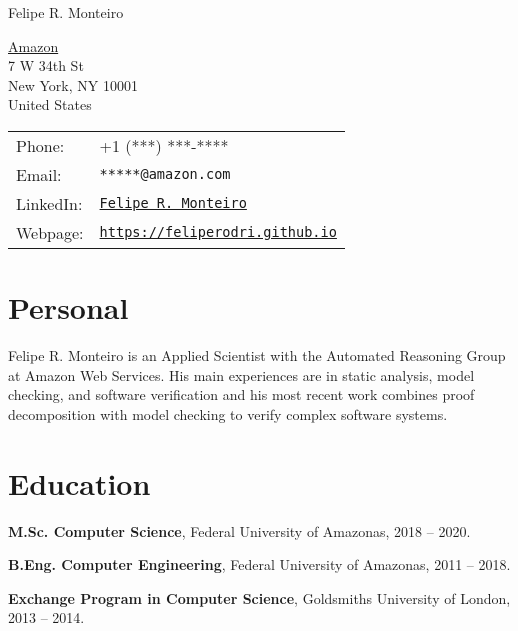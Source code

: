 \documentclass[letterpaper]{article}
\def\name{Felipe R. Monteiro}
\renewenvironment{itemize}{
  \begin{list}{}{
    \setlength{\leftmargin}{1.5em}
  }
}{
  \end{list}
}
\begin{document}
{\huge \name}


\vspace{0.25in}

\begin{minipage}{0.45\linewidth}
  \href{https://aws.amazon.com/security/provable-security/}{Amazon} \\
  7 W 34th St \\
 New York, NY 10001 \\
  United States
\end{minipage}
\hfill
\begin{minipage}{0.45\linewidth}
  \begin{tabular}{ll}
    Phone: & +1 (***) ***-**** \\
    Email: & {\tt ******@amazon.com} \\
    LinkedIn: & \href{https://www.linkedin.com/in/felipe-r-monteiro-91643157/}{\tt Felipe R. Monteiro} \\
    Webpage: & \href{https://feliperodri.github.io}{\tt https://feliperodri.github.io} \\
  \end{tabular}
\end{minipage}

\section*{Personal}

Felipe R. Monteiro is an Applied Scientist with the Automated Reasoning Group at Amazon Web Services. His main experiences are in static analysis, model checking, and software verification and his most recent work combines proof decomposition with model checking to verify complex software systems.

\section*{Education}

\begin{itemize}
  \item {\bf M.Sc. Computer Science}, Federal University of Amazonas, 2018 -- 2020.
  \item {\bf B.Eng. Computer Engineering}, Federal University of Amazonas, 2011 -- 2018.
  \begin{itemize}
    \item {\bf Exchange Program in Computer Science}, Goldsmiths University of London, 2013 -- 2014.
\end{itemize}
\end{itemize}
\end{document}
